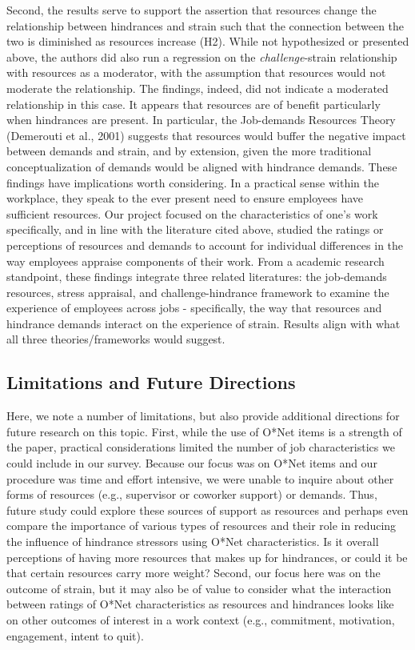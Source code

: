 \documentclass[
  man]{apa6}
\begin{document}
Second, the results serve to support the assertion that resources change the relationship between hindrances and strain such that the connection between the two is diminished as resources increase (H2). While not hypothesized or presented above, the authors did also run a regression on the \emph{challenge}-strain relationship with resources as a moderator, with the assumption that resources would not moderate the relationship. The findings, indeed, did not indicate a moderated relationship in this case. It appears that resources are of benefit particularly when hindrances are present. In particular, the Job-demands Resources Theory (Demerouti et al., 2001) suggests that resources would buffer the negative impact between demands and strain, and by extension, given the more traditional conceptualization of demands would be aligned with hindrance demands.
These findings have implications worth considering. In a practical sense within the workplace, they speak to the ever present need to ensure employees have sufficient resources. Our project focused on the characteristics of one's work specifically, and in line with the literature cited above, studied the ratings or perceptions of resources and demands to account for individual differences in the way employees appraise components of their work. From a academic research standpoint, these findings integrate three related literatures: the job-demands resources, stress appraisal, and challenge-hindrance framework to examine the experience of employees across jobs - specifically, the way that resources and hindrance demands interact on the experience of strain. Results align with what all three theories/frameworks would suggest.

\hypertarget{limitations-and-future-directions}{%
\subsection{Limitations and Future Directions}\label{limitations-and-future-directions}}

Here, we note a number of limitations, but also provide additional directions for future research on this topic. First, while the use of O*Net items is a strength of the paper, practical considerations limited the number of job characteristics we could include in our survey. Because our focus was on O*Net items and our procedure was time and effort intensive, we were unable to inquire about other forms of resources (e.g., supervisor or coworker support) or demands. Thus, future study could explore these sources of support as resources and perhaps even compare the importance of various types of resources and their role in reducing the influence of hindrance stressors using O*Net characteristics. Is it overall perceptions of having more resources that makes up for hindrances, or could it be that certain resources carry more weight? Second, our focus here was on the outcome of strain, but it may also be of value to consider what the interaction between ratings of O*Net characteristics as resources and hindrances looks like on other outcomes of interest in a work context (e.g., commitment, motivation, engagement, intent to quit).
\end{document}
